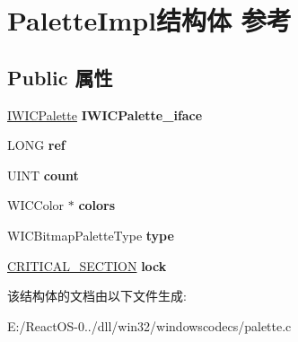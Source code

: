 \hypertarget{struct_palette_impl}{}\section{Palette\+Impl结构体 参考}
\label{struct_palette_impl}
\subsection*{Public 属性}
\begin{DoxyCompactItemize}
\item 
\mbox{\label{struct_palette_impl_ad86f50e537ffef38bc4c243ef578ba23}} 
\hyperlink{interface_i_w_i_c_palette}{I\+W\+I\+C\+Palette} {\bfseries I\+W\+I\+C\+Palette\+\_\+iface}
\item 
\mbox{\label{struct_palette_impl_a98a056b5e89fa24376f32b04ccb3ae1f}} 
L\+O\+NG {\bfseries ref}
\item 
\mbox{\label{struct_palette_impl_abd1e724d6f37162512d7634f147c01c8}} 
U\+I\+NT {\bfseries count}
\item 
\mbox{\label{struct_palette_impl_ad29fb8685897c5dcb9f095bddc318cea}} 
W\+I\+C\+Color $\ast$ {\bfseries colors}
\item 
\mbox{\label{struct_palette_impl_ad79e15f498e584564e0538adfc7dd346}} 
W\+I\+C\+Bitmap\+Palette\+Type {\bfseries type}
\item 
\mbox{\label{struct_palette_impl_a0d91b6e32fd873e939bb51f3cb4646be}} 
\hyperlink{struct___c_r_i_t_i_c_a_l___s_e_c_t_i_o_n}{C\+R\+I\+T\+I\+C\+A\+L\+\_\+\+S\+E\+C\+T\+I\+ON} {\bfseries lock}
\end{DoxyCompactItemize}


该结构体的文档由以下文件生成\+:\begin{DoxyCompactItemize}
\item 
E\+:/\+React\+O\+S-\/0../dll/win32/windowscodecs/palette.\+c\end{DoxyCompactItemize}
